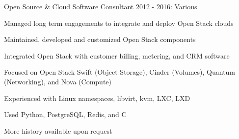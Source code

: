 \begin{cventries}
  \cventry
    {Open Source \& Cloud Software Consultant} %
    {2012 - 2016: Various} %
    {} %
    {} %
    {
      \begin{cvitems} %
        \item {Managed long term engagements to integrate and deploy Open Stack clouds}
        \item {Maintained, developed and customized Open Stack components}
        \item {Integrated Open Stack with customer billing, metering, and CRM software}
        \item {Focused on Open Stack Swift (Object Storage), Cinder (Volumes), Quantum (Networking), and Nova (Compute)}
        \item {Experienced with Linux namespaces, libvirt, kvm, LXC, LXD}
        \item {Used Python, PostgreSQL, Redis, and C}
        \item {More history available upon request}
      \end{cvitems}
    }
    {}

\end{cventries}
